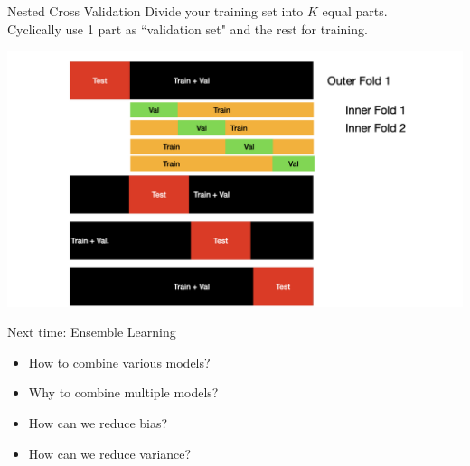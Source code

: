 \documentclass[usenames,dvipsnames]{beamer}
\begin{document}
\begin{frame}{Nested Cross Validation}
	Divide your training set into $K$ equal 	parts.\\
	Cyclically use 1 part as ``validation set" and the rest for training.\\
	\begin{center}
	\includegraphics[scale=0.18]{../assets/bias-variance/cross-validation.002.jpeg}
	\end{center}
	\end{frame}
	


\begin{frame}{Next time: Ensemble Learning}
\begin{itemize}
\item How to combine various models?
\item Why to combine multiple models?
\item How can we reduce bias?
\item How can we reduce variance?
\end{itemize}
\end{frame}
\end{document}
